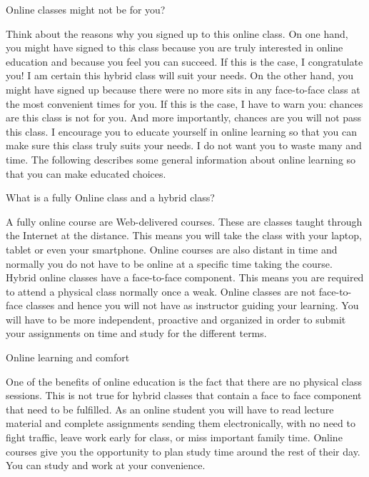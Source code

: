 \documentclass[main.tex]{subfiles}
\begin{document}
\pagestyle{style3}

\begin{fullwidth}
\begin{multicols*}{2}
\noindent\begin{bf}Online classes might not be for you?\end{bf}\par
Think about the reasons why you signed up to this online class. On one hand, you might have signed to this class because you are truly interested in online education and because you feel you can succeed. If this is the case, I congratulate you! I am certain this hybrid class will suit your needs. On the other hand, you might have signed up because there were no more sits in any face-to-face class at the most convenient times for you. If this is the case, I have to warn you: chances are this class is not for you. And more importantly, chances are you will not pass this class.
I encourage you to educate yourself in online learning so that you can make sure this class truly suits your needs. I do not want you to waste many and time.  The following describes some general information about online learning so that you can make educated choices.

\noindent\begin{bf}What is a fully Online class and a hybrid class?\end{bf}\par
A fully online course are Web-delivered courses. These are classes taught through the Internet at the distance. This means you will take the class with your laptop, tablet or even your smartphone. Online courses are also distant in time and normally you do not have to be online at a specific time taking the course. Hybrid online classes have a face-to-face component. This means you are required to attend a physical class normally once a weak. Online classes are not face-to-face classes and hence you will not have as instructor guiding your learning. You will have to be more independent, proactive and organized in order to submit your assignments on time and study for the different terms.

\noindent\begin{bf} Online learning and comfort\end{bf}\par
One of the benefits of online education is the fact that there are no physical class sessions. This is not true for hybrid classes that contain a face to face component that need to be fulfilled. As an online student you will have to read lecture material and complete assignments sending them electronically, with no need to fight traffic, leave work early for class, or miss important family time. Online courses give you the opportunity to plan study time around the rest of their day. You can study and work at your convenience. 


\end{multicols*}
\end{fullwidth}
\end{document}
